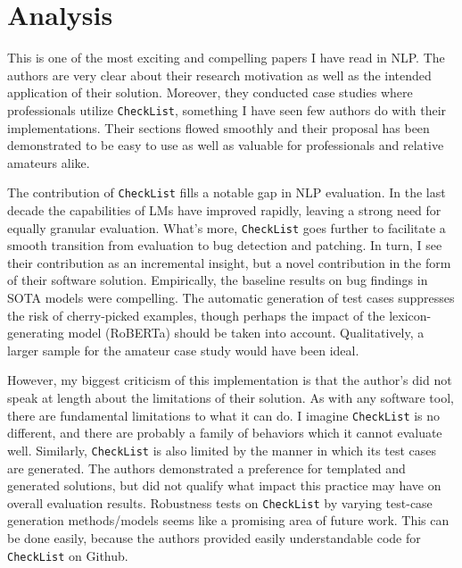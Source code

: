 \documentclass[11pt,a4paper]{article}
\begin{document}
\section{Analysis}%
\label{sec:Analysis}

This is one of the most exciting and compelling papers I have read in NLP. The authors are very clear about
their research motivation as well as the intended application of their solution. Moreover, they conducted
case studies where professionals utilize \texttt{CheckList}, something I have seen few authors do with their 
implementations. Their sections flowed smoothly and their proposal has been demonstrated to be easy to use 
as well as valuable for professionals and relative amateurs alike.

The contribution of \texttt{CheckList} fills a notable gap in NLP evaluation. In the last decade the capabilities of
LMs have improved rapidly, leaving a strong need for equally granular evaluation. What's more, \texttt{CheckList} 
goes further to facilitate a smooth transition from evaluation to bug detection and patching. In turn, I see their contribution as an
incremental insight, but a novel contribution in the form of their software solution.
Empirically, the baseline results on bug findings in SOTA models were compelling. The automatic generation
of test cases suppresses the risk of cherry-picked examples, though perhaps the impact of the lexicon-generating model (RoBERTa)
should be taken into account. Qualitatively, a larger sample 
for the amateur case study would have been ideal.

However, my biggest criticism of this implementation is that the author's did not speak at length 
about the limitations of their solution. As with any software tool, there are fundamental limitations to what it 
can do. I imagine \texttt{CheckList} is no different, and there are probably a family of behaviors which
it cannot evaluate well. Similarly, \texttt{CheckList} is also limited by the manner in which its test cases are generated. The 
authors demonstrated a preference for templated and generated solutions, but did not qualify what impact this practice may have on
overall evaluation results. Robustness tests on \texttt{CheckList} by varying test-case generation methods/models
seems like a promising area of future work. This can be done easily, because the authors provided easily understandable code for
\texttt{CheckList} on Github.




\end{document}
